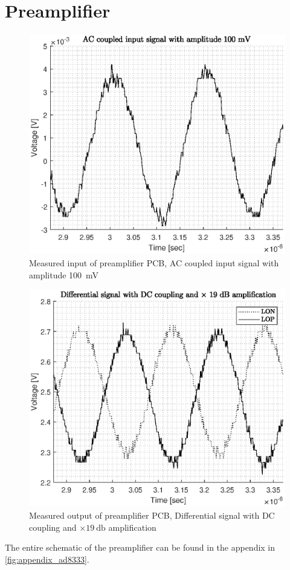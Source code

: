 \section{Preamplifier} 
\begin{figure}[htbp]
	\centering
	\includegraphics[width=.8\textwidth]{Figures/4_preamplifier_pcb_in.eps}
	\caption[Measured input of preamplifier PCB]{Measured input of preamplifier PCB, AC coupled input signal with amplitude \qty{100}{\milli\volt}}
	\label{fig:4_preamp_in}
\end{figure}
\begin{figure}[htbp]
	\centering
	\includegraphics[width=.8\textwidth]{Figures/4_preamplifier_pcb_out.eps}
	\caption[Measured output of preamplifier PCB]{Measured output of preamplifier PCB, Differential signal with DC coupling and $\times \qty{19}{\decibel}$ amplification}
	\label{fig:4_preamp_out}
\end{figure}
The entire schematic of the preamplifier can be found in the appendix in \cref{fig:appendix_ad8333}.
